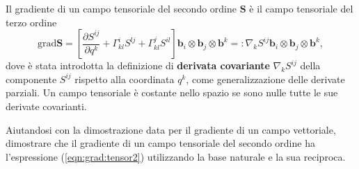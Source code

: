 \noindent
Il gradiente di un campo tensoriale del secondo ordine $\bm{S}$ è il campo tensoriale del terzo ordine
 \begin{equation}\label{eqn:grad:tensor2}
   \text{grad} \bm{S} = \left[ \dfrac{\partial S^{ij}}{\partial q^k} + \Gamma_{kl}^i S^{lj} + \Gamma_{kl}^j S^{il} \right]
               \bm{b}_i \otimes \bm{b}_j \otimes \bm{b}^k =: \nabla_k S^{ij} \bm{b}_i \otimes \bm{b}_j \otimes \bm{b}^k ,
 \end{equation}
 dove è stata introdotta la definizione di \textbf{derivata covariante} $\nabla_k S^{ij}$ della componente $S^{ij}$ rispetto alla coordinata $q^k$, come generalizzazione delle derivate parziali. Un campo tensoriale è costante nello spazio se sono nulle tutte le sue derivate covarianti.
\begin{exercise}
 Aiutandosi con la dimostrazione data per il gradiente di un campo vettoriale, dimostrare che il gradiente di un campo tensoriale del secondo ordine ha l'espressione (\ref{eqn:grad:tensor2}) utilizzando la base naturale e la sua reciproca.
\end{exercise}
%

